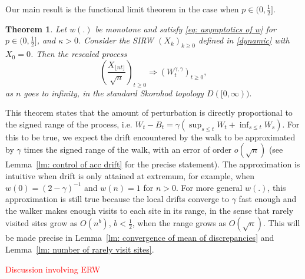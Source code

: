 \documentclass[twoside,12pt,a4paper]{article}
\newtheorem{theorem}{Theorem}[section]
\numberwithin{equation}{section}
\newcommand{\edt}[1]{\textcolor{red}{#1}} %
\begin{document}
	\begin{samepage}
		Our main result is the functional limit theorem in the case when $p\in (0,\frac{1}{2}]$.
		\begin{theorem}\label{thm: main}
			Let $w(.)$ be monotone and satisfy \eqref{eq: asymptotics of w} for $p\in (0,\frac{1}{2}]$, and $\kappa >0 $. Consider the SIRW $(X_k)_{k\geq 0}$ defined in \eqref{dynamic} with $X_0 =0$. Then the rescaled process
			\[
			\left(  \frac{X_{\lfloor nt \rfloor }}{\sqrt{n}}  \right)_{t\geq 0} \Longrightarrow \left( W^{\gamma,\gamma}_{t}\right)_{t\geq 0},
			\]
			as $n$ goes to infinity, in the standard Skorohod topology $D([0,\infty) ).$
		\end{theorem}
	\end{samepage}
	This theorem states that the amount of perturbation is directly proportional to the signed range of the process, i.e. $W_t - B_t = \gamma \left( \sup_{s \le t} W_t + \inf _{s \le t} W_s \right) $. 
	For this to be true, we expect the drift encountered by the walk to be approximated by $\gamma$ times the signed range of the walk, with an error of order $o\left(\sqrt{n} \right)$ (see Lemma~\ref{lm: control of acc drift} for the precise statement). 
	The approximation is intuitive when drift is only attained at extremum, for example, when $w(0) = (2 - \gamma)^{-1}$ and $w(n) = 1$ for $n > 0$. 
	For more general $w(.)$, this approximation is still true because the local drifts converge to $\gamma$ fast enough and the walker makes enough visits to each site in its range, in the sense that rarely visited sites grow as $O(n^b)$,  $b < \frac{1}{2}$, when the range grows as $O(\sqrt{n} )$. This will be made precise in Lemma~\ref{lm: convergence of mean of discrepancies} and Lemma~\ref{lm: number of rarely visit sites}.
	
	
	\edt{Discussion involving ERW}
	
\end{document}
